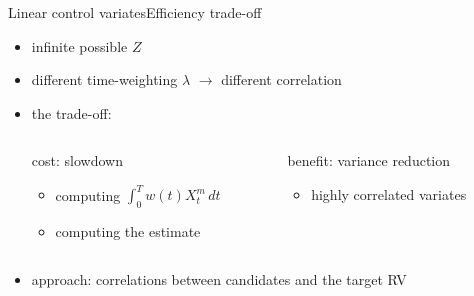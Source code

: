 \documentclass[9pt]{beamer}
\begin{document}
\begin{frame}{Linear control variates}{Efficiency trade-off}
    \begin{itemize}
        \item infinite possible $Z$
        \item different time-weighting $\lambda$ $\rightarrow$ different correlation
        \item the trade-off:
    \begin{columns}
        \begin{column}{.5\textwidth}
            \begin{block}{cost: slowdown}
                \vspace{1ex}
                \begin{center}
                \end{center}
                \begin{itemize}
                    \item computing $\int_{0}^T w(t)X_t^m\,dt$
                    \item computing the estimate
                \end{itemize}
            \end{block}
        \end{column}
        \begin{column}{.5\textwidth}
            \begin{block}{benefit: variance reduction}
                \vspace{1ex}
                \begin{center}
                \end{center}
                \begin{itemize}
                    \item highly correlated variates
                \end{itemize}
            \end{block}
        \end{column}
    \end{columns}
            \vspace{1em}
    \item approach: correlations between candidates and the target RV
    \end{itemize}

\end{frame}
\end{document}
